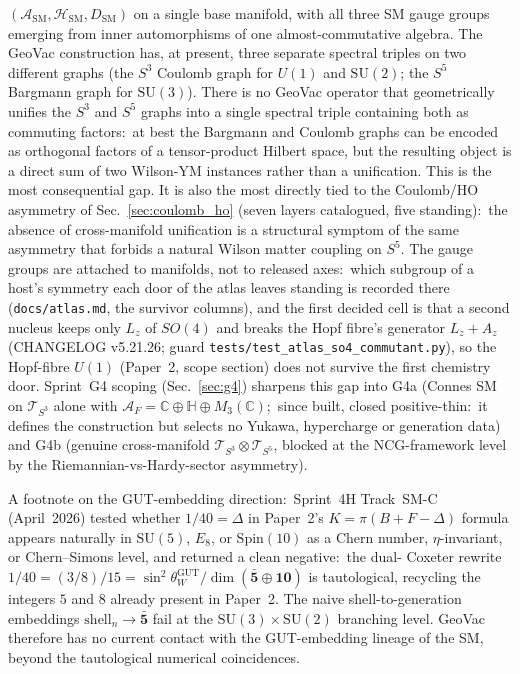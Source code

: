\documentclass[11pt]{article}
\begin{document}
\begin{enumerate}
$(\mathcal{A}_{\mathrm{SM}}, \mathcal{H}_{\mathrm{SM}},
D_{\mathrm{SM}})$ on a single base manifold, with all three SM
gauge groups emerging from inner automorphisms of one
almost-commutative algebra.  The GeoVac construction has, at
present, three separate spectral triples on two different graphs
(the $S^3$ Coulomb graph for $U(1)$ and $\mathrm{SU}(2)$; the $S^5$
Bargmann graph for $\mathrm{SU}(3)$).  There is no GeoVac operator
that geometrically unifies the $S^3$ and $S^5$ graphs into a
single spectral triple containing both as commuting factors:\ at
best the Bargmann and Coulomb graphs can be encoded as orthogonal
factors of a tensor-product Hilbert space, but the resulting
object is a direct sum of two Wilson-YM instances rather than a
unification.  This is the most consequential gap.  It is also the
most directly tied to the Coulomb/HO asymmetry of
Sec.~\ref{sec:coulomb_ho} (seven layers catalogued, five standing):\
the absence of cross-manifold unification is a structural symptom of
the same asymmetry that forbids a natural Wilson matter coupling on
$S^5$.
The gauge groups are attached to manifolds, not to released axes:\
which subgroup of a host's symmetry each door of the atlas leaves
standing is recorded there (\texttt{docs/atlas.md}, the survivor
columns), and the first decided cell is that a second nucleus keeps
only $L_z$ of $SO(4)$ and breaks the Hopf fibre's generator $L_z + A_z$
(CHANGELOG v5.21.26; guard
\texttt{tests/test\_atlas\_so4\_commutant.py}), so the Hopf-fibre
$U(1)$ (Paper~2, scope section) does not survive the first chemistry door.
Sprint~G4 scoping (Sec.~\ref{sec:g4}) sharpens this gap into G4a
(Connes SM on $\mathcal{T}_{S^3}$ alone with
$\mathcal{A}_F = \mathbb{C} \oplus \mathbb{H} \oplus M_3(\mathbb{C})$;\
since built, closed positive-thin:\ it defines the construction but
selects no Yukawa, hypercharge or generation data) and G4b (genuine
cross-manifold $\mathcal{T}_{S^3} \otimes \mathcal{T}_{S^5}$, blocked
at the NCG-framework level by the Riemannian-vs-Hardy-sector
asymmetry).
\end{enumerate}

A footnote on the GUT-embedding direction:\ Sprint~4H Track~SM-C
(April~2026) tested whether $1/40 = \Delta$ in Paper~2's $K = \pi(B
+ F - \Delta)$ formula appears naturally in $\mathrm{SU}(5)$,
$E_8$, or $\mathrm{Spin}(10)$ as a Chern number, $\eta$-invariant,
or Chern--Simons level, and returned a clean negative:\ the dual-%
Coxeter rewrite $1/40 = (3/8)/15 = \sin^2\theta_W^{\mathrm{GUT}} /
\dim(\mathbf{\bar{5}} \oplus \mathbf{10})$ is tautological,
recycling the integers $5$ and $8$ already present in Paper~2.  The
naive shell-to-generation embeddings $\mathrm{shell}_n \to
\mathbf{\bar{5}}$ fail at the $\mathrm{SU}(3) \times \mathrm{SU}(2)$
branching level.  GeoVac therefore has no current contact with the
GUT-embedding lineage of the SM, beyond the tautological numerical
coincidences.
\end{document}
